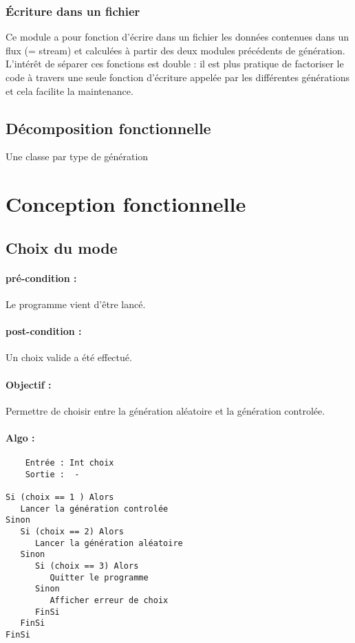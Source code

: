 			\subsubsection{Écriture dans un fichier}
				Ce module a pour fonction d’écrire dans un fichier les données contenues dans un flux (= stream)  et calculées à partir des deux modules précédents de génération. L’intérêt de séparer ces fonctions est double : il est plus pratique de factoriser le code à travers une seule fonction d’écriture appelée par les différentes générations et cela facilite la maintenance.


		\subsection{Décomposition fonctionnelle}
			Une classe par type de génération 


	\section{Conception fonctionnelle}

		\subsection{Choix du mode}
			\paragraph{pré-condition :} Le programme vient d’être lancé.
			\paragraph{post-condition :} Un choix valide a été effectué.
			\paragraph{Objectif :} Permettre de choisir entre la génération aléatoire et la génération controlée.
			\paragraph{Algo :}
			\begin{verbatim} 
	Entrée : Int choix
	Sortie :  -

Si (choix == 1 ) Alors
   Lancer la génération controlée
Sinon
   Si (choix == 2) Alors
	  Lancer la génération aléatoire 
   Sinon
	  Si (choix == 3) Alors
	     Quitter le programme
	  Sinon
	     Afficher erreur de choix 
	  FinSi
   FinSi
FinSi
		\end{verbatim} 

